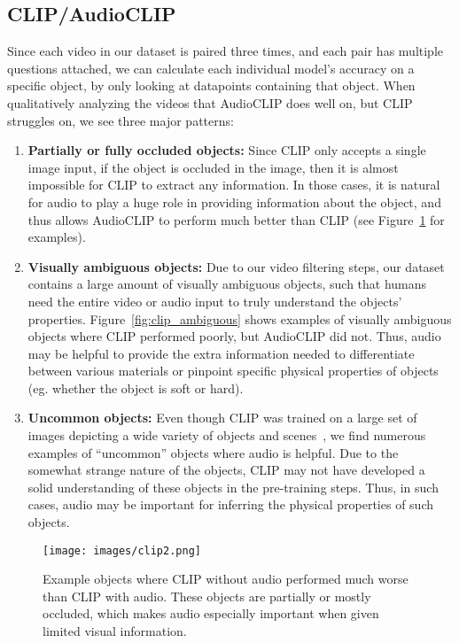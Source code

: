 \documentclass[runningheads]{llncs}
\begin{document}
\subsection{CLIP/AudioCLIP}
Since each video in our dataset is paired three times, and each pair has multiple questions attached, we can calculate each individual model's accuracy on a specific object, by only looking at datapoints containing that object. When qualitatively analyzing the videos that AudioCLIP does well on, but CLIP struggles on, we see three major patterns:
\begin{enumerate}

    \item \textbf{Partially or fully occluded objects:} Since CLIP only accepts a single image input, if the object is occluded in the image, then it is almost impossible for CLIP to extract any information. In those cases, it is natural for audio to play a huge role in providing information about the object, and thus allows AudioCLIP to perform much better than CLIP (see Figure~\ref{fig:clip_occluded} for examples).
    \item \textbf{Visually ambiguous objects:} Due to our video filtering steps, our dataset contains a large amount of visually ambiguous objects, such that humans need the entire video or audio input to truly understand the objects' properties. Figure~\ref{fig:clip_ambiguous} shows examples of visually ambiguous objects where CLIP performed poorly, but AudioCLIP did not. Thus, audio may be helpful to provide the extra information needed to differentiate between various materials or pinpoint specific physical properties of objects (eg. whether the object is soft or hard).
    \item \textbf{Uncommon objects:} Even though CLIP was trained on a large set of images depicting a wide variety of objects and scenes~\cite{radford2021clip}, we find numerous examples of ``uncommon'' objects where audio is helpful. Due to the somewhat strange nature of the objects, CLIP may not have developed a solid understanding of these objects in the pre-training steps. Thus, in such cases, audio may be important for inferring the physical properties of such objects.
\end{enumerate}



\begin{figure}[t]
    \centering
  \texttt{[image: images/clip2.png]}
  \caption{Example objects where CLIP without audio performed much worse than CLIP with audio. These objects are partially or mostly occluded, which makes audio especially important when given limited visual information. }
  \label{fig:clip_occluded}
\end{figure}
\end{document}
